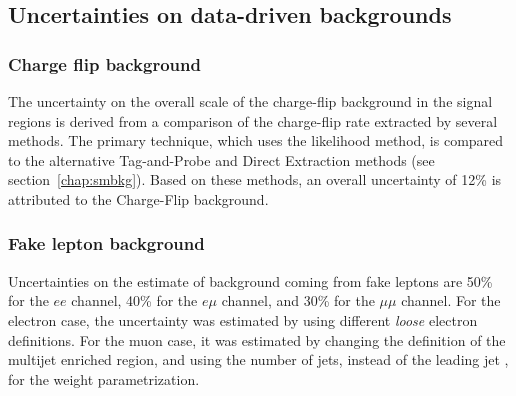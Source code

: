 \subsection{Uncertainties on data-driven backgrounds}

\subsubsection{Charge flip background}
 The uncertainty on the overall scale of the charge-flip background in the signal regions is derived from a comparison of the charge-flip rate extracted by several methods.
The primary technique, which uses the likelihood method, is compared to the alternative Tag-and-Probe and Direct Extraction methods (see section~\ref{chap:smbkg}).
Based on these methods, an overall uncertainty of 12\% is attributed to the Charge-Flip background.

\subsubsection{Fake lepton background}

Uncertainties on the estimate of background coming from fake leptons are 50\% for the $ee$ channel, 40\% for the $e\mu$ channel, and 30\% for the $\mu\mu$ channel.
For the electron case, the uncertainty was estimated by using different {\it loose} electron definitions. For the muon case, it was estimated by changing the definition of the multijet enriched region, and using the number of jets, instead of the leading jet \pT{}, for the weight parametrization.







